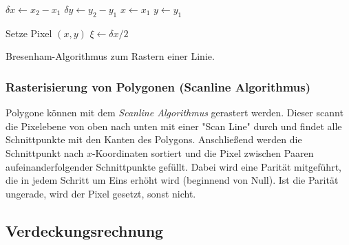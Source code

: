 				\begin{algorithm}
					\DontPrintSemicolon
					
					
					\( \delta x \gets x_2 - x_1 \)\;
					\( \delta y \gets y_2 - y_1 \) \;
					\( x \gets x_1 \) \;
					\( y \gets y_1 \) \;
					
					
					Setze Pixel \( (x, y) \) \;
					\( \xi \gets \delta x / 2 \) \;
					
				
					\caption{Bresenham-Algorithmus zum Rastern einer Linie.}
					\label{alg:bresenham}
				\end{algorithm}

			\subsubsection{Rasterisierung von Polygonen (Scanline Algorithmus)}
				Polygone können \bspw mit dem \emph{Scanline Algorithmus} gerastert werden. Dieser scannt die Pixelebene von oben nach unten mit einer "Scan Line" durch und findet alle Schnittpunkte mit den Kanten des Polygons. Anschließend werden die Schnittpunkt nach \(x\)-Koordinaten sortiert und die Pixel zwischen Paaren aufeinanderfolgender Schnittpunkte gefüllt. Dabei wird eine Parität mitgeführt, die in jedem Schritt um Eins erhöht wird (beginnend von Null). Ist die Parität ungerade, wird der Pixel gesetzt, sonst nicht.

		\subsection{Verdeckungsrechnung}
